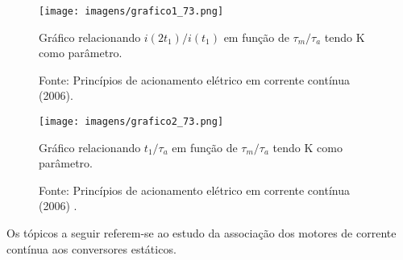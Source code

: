 \begin{figure}[ht!]
\center
\texttt{[image: imagens/grafico1\_73.png]}
\caption{\label{fig:G1_73} Gráfico relacionando $i(2t_{1})/i(t_{1})$ em função de $\tau_{m}/\tau_{a}$ tendo K como parâmetro.}
\caption*{Fonte: Princípios de acionamento elétrico em corrente contínua (2006).}
\end{figure}

\begin{figure}[ht!]
\center
\texttt{[image: imagens/grafico2\_73.png]}
\caption{\label{fig:G2_73} Gráfico relacionando $t_{1}/\tau_{a}$ em função de $\tau_{m}/\tau_{a}$ tendo K como parâmetro.}
\caption*{Fonte: Princípios de acionamento elétrico em corrente contínua (2006) .}
\end{figure}

Os tópicos a seguir referem-se ao estudo da associação dos motores de corrente contínua aos conversores estáticos.

